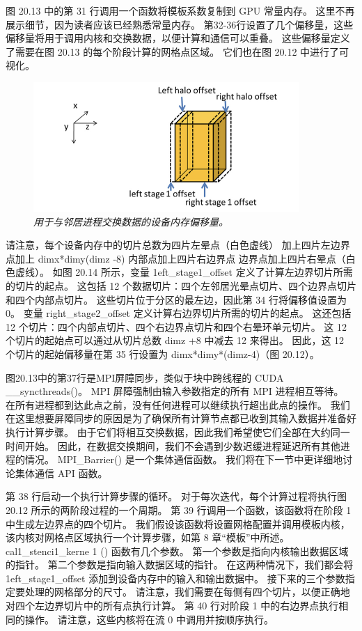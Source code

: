 图 20.13 中的第 31 行调用一个函数将模板系数复制到 GPU 常量内存。 这里不再展示细节，因为读者应该已经熟悉常量内存。 
第32-36行设置了几个偏移量，这些偏移量将用于调用内核和交换数据，以便计算和通信可以重叠。 
这些偏移量定义了需要在图 20.13 的每个阶段计算的网格点区域。 它们也在图 20.12 中进行了可视化。

\begin{figure}[H]
	\centering
	\includegraphics[width=0.9\textwidth]{figs/F20.14.png}
	\caption{\textit{用于与邻居进程交换数据的设备内存偏移量。}}
\end{figure}

请注意，每个设备内存中的切片总数为四片左晕点（白色虚线）
加上四片左边界点加上 dimx*dimy(dimz -8) 内部点加上四片右边界点 边界点加上四片右晕点（白色虚线）。 
如图 20.14 所示，变量 1eft\_stage1\_offset 定义了计算左边界切片所需的切片的起点。 
这包括 12 个数据切片：四个左邻居光晕点切片、四个边界点切片和四个内部点切片。 
这些切片位于分区的最左边，因此第 34 行将偏移值设置为 0。 
变量 right\_stage2\_offset 定义计算右边界切片所需的切片的起点。 
这还包括 12 个切片：四个内部点切片、四个右边界点切片和四个右晕环单元切片。 
这 12 个切片的起始点可以通过从切片总数 dimz +8 中减去 12 来得出。 
因此，这 12 个切片的起始偏移量在第 35 行设置为 dimx*dimy*(dimz-4)（图 20.12）。

图20.13中的第37行是MPI屏障同步，类似于块中跨线程的 CUDA \_\_syncthreads()。 
MPI 屏障强制由输入参数指定的所有 MPI 进程相互等待。 在所有进程都到达此点之前，没有任何进程可以继续执行超出此点的操作。 
我们在这里想要屏障同步的原因是为了确保所有计算节点都已收到其输入数据并准备好执行计算步骤。 
由于它们将相互交换数据，因此我们希望使它们全部在大约同一时间开始。 
因此，在数据交换期间，我们不会遇到少数迟缓进程延迟所有其他进程的情况。 
MPI\_Barrier() 是一个集体通信函数。 我们将在下一节中更详细地讨论集体通信 API 函数。

第 38 行启动一个执行计算步骤的循环。 对于每次迭代，每个计算过程将执行图 20.12 所示的两阶段过程的一个周期。 
第 39 行调用一个函数，该函数将在阶段 1 中生成左边界点的四个切片。 
我们假设该函数将设置网格配置并调用模板内核，该内核对网格点区域执行一个计算步骤，如第 8 章“模板”中所述。 
cal1\_stenci1\_kerne 1 () 函数有几个参数。 
第一个参数是指向内核输出数据区域的指针。 第二个参数是指向输入数据区域的指针。 
在这两种情况下，我们都会将 1eft\_stage1\_offset 添加到设备内存中的输入和输出数据中。 
接下来的三个参数指定要处理的网格部分的尺寸。 
请注意，我们需要在每侧有四个切片，以便正确地对四个左边界切片中的所有点执行计算。 
第 40 行对阶段 1 中的右边界点执行相同的操作。 请注意，这些内核将在流 0 中调用并按顺序执行。

